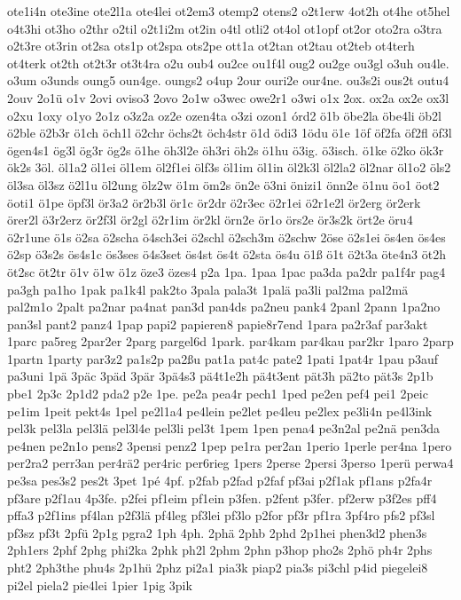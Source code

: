 {ote1i4n
ote3ine
ote2l1a
ote4lei
ot2em3
otemp2
otens2
o2t1erw
4ot2h
ot4he
ot5hel
o4t3hi
ot3ho
o2thr
o2til
o2t1i2m
ot2in
o4tl
otli2
ot4ol
ot1opf
ot2or
oto2ra
o3tra
o2t3re
ot3rin
ot2sa
ots1p
ot2spa
ots2pe
ott1a
ot2tan
ot2tau
ot2teb
ot4terh
ot4terk
ot2th
ot2t3r
ot3t4ra
o2u
oub4
ou2ce
ou1f4l
oug2
ou2ge
ou3gl
o3uh
ou4le.
o3um
o3unds
oung5
oun4ge.
oungs2
o4up
2our
ouri2e
our4ne.
ou3s2i
ous2t
outu4
2ouv
2o1ü
o1v
2ovi
oviso3
2ovo
2o1w
o3wec
owe2r1
o3wi
o1x
2ox.
ox2a
ox2e
ox3l
o2xu
1oxy
o1yo
2o1z
o3z2a
oz2e
ozen4ta
o3zi
ozon1
órd2
ö1b
öbe2la
öbe4li
öb2l
ö2ble
ö2b3r
ö1ch
öch1l
ö2chr
öchs2t
öch4str
ö1d
ödi3
1ödu
ö1e
1öf
öf2fa
öf2fl
öf3l
ögen4s1
ög3l
ög3r
ög2s
ö1he
öh3l2e
öh3ri
öh2s
ö1hu
ö3ig.
ö3isch.
ö1ke
ö2ko
ök3r
ök2s
3öl.
öl1a2
öl1ei
öl1em
öl2f1ei
ölf3s
öl1im
öl1in
öl2k3l
öl2la2
öl2nar
öl1o2
öls2
öl3sa
öl3sz
ö2l1u
öl2ung
ölz2w
ö1m
öm2s
ön2e
ö3ni
önizi1
önn2e
ö1nu
öo1
öot2
öoti1
ö1pe
öpf3l
ör3a2
ör2b3l
ör1c
ör2dr
ö2r3ec
ö2r1ei
ö2r1e2l
ör2erg
ör2erk
örer2l
ö3r2erz
ör2f3l
ör2gl
ö2r1im
ör2kl
örn2e
ör1o
örs2e
ör3s2k
ört2e
öru4
ö2r1une
ö1s
ö2sa
ö2scha
ö4sch3ei
ö2schl
ö2sch3m
ö2schw
2öse
ö2s1ei
ös4en
ös4es
ö2sp
ö3s2s
ös4s1c
ös3ses
ö4s3set
ös4st
ös4t
ö2sta
ös4u
ö1ß
ö1t
ö2t3a
öte4n3
öt2h
öt2sc
öt2tr
ö1v
ö1w
ö1z
öze3
özes4
p2a
1pa.
1paa
1pac
pa3da
pa2dr
pa1f4r
pag4
pa3gh
pa1ho
1pak
pa1k4l
pak2to
3pala
pala3t
1palä
pa3li
pal2ma
pal2mä
pal2m1o
2palt
pa2nar
pa4nat
pan3d
pan4ds
pa2neu
pank4
2panl
2pann
1pa2no
pan3sl
pant2
panz4
1pap
papi2
papieren8
papie8r7end
1para
pa2r3af
par3akt
1parc
pa5reg
2par2er
2parg
pargel6d
1park.
par4kam
par4kau
par2kr
1paro
2parp
1partn
1party
par3z2
pa1s2p
pa2ßu
pat1a
pat4c
pate2
1pati
1pat4r
1pau
p3auf
pa3uni
1pä
3päc
3päd
3pär
3pä4s3
pä4t1e2h
pä4t3ent
pät3h
pä2to
pät3s
2p1b
pbe1
2p3c
2p1d2
pda2
p2e
1pe.
pe2a
pea4r
pech1
1ped
pe2en
pef4
pei1
2peic
pe1im
1peit
pekt4s
1pel
pe2l1a4
pe4lein
pe2let
pe4leu
pe2lex
pe3li4n
pe4l3ink
pel3k
pel3la
pel3lä
pel3l4e
pel3li
pel3t
1pem
1pen
pena4
pe3n2al
pe2nä
pen3da
pe4nen
pe2n1o
pens2
3pensi
penz2
1pep
pe1ra
per2an
1perio
1perle
per4na
1pero
per2ra2
perr3an
per4rä2
per4ric
per6rieg
1pers
2perse
2persi
3perso
1perü
perwa4
pe3sa
pes3s2
pes2t
3pet
1pé
4pf.
p2fab
p2fad
p2faf
pf3ai
p2f1ak
pf1ans
p2fa4r
pf3are
p2f1au
4p3fe.
p2fei
pf1eim
pf1ein
p3fen.
p2fent
p3fer.
pf2erw
p3f2es
pff4
pffa3
p2f1ins
pf4lan
p2f3lä
pf4leg
pf3lei
pf3lo
p2for
pf3r
pf1ra
3pf4ro
pfs2
pf3sl
pf3sz
pf3t
2pfü
2p1g
pgra2
1ph
4ph.
2phä
2phb
2phd
2p1hei
phen3d2
phen3s
2ph1ers
2phf
2phg
phi2ka
2phk
ph2l
2phm
2phn
p3hop
pho2s
2phö
ph4r
2phs
pht2
2ph3the
phu4s
2p1hü
2phz
pi2a1
pia3k
piap2
pia3s
pi3chl
p4id
piegelei8
pi2el
piela2
pie4lei
1pier
1pig
3pik
}
